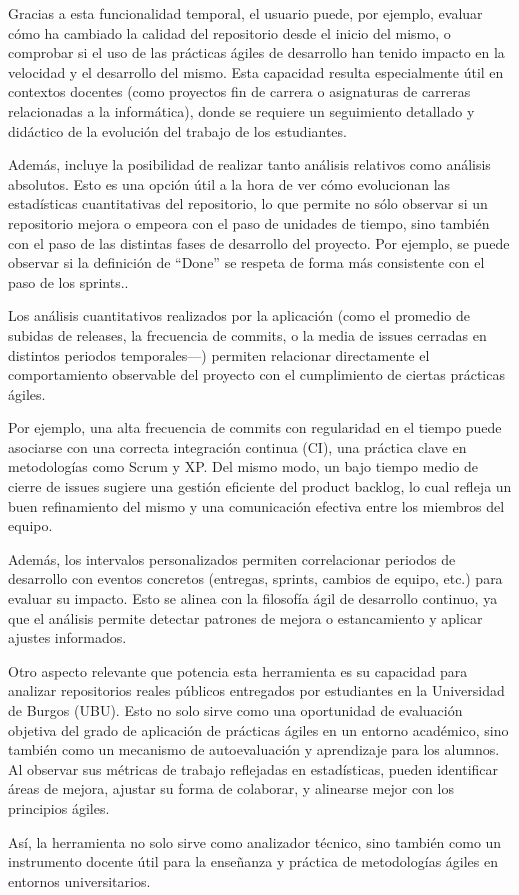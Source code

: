 Gracias a esta funcionalidad temporal, el usuario puede, por ejemplo, evaluar cómo ha cambiado la calidad del repositorio desde el inicio del mismo, o comprobar si el uso de las prácticas ágiles de desarrollo han tenido impacto en la velocidad y el desarrollo del mismo. Esta capacidad resulta especialmente útil en contextos docentes (como proyectos fin de carrera o asignaturas de carreras relacionadas a la informática), donde se requiere un seguimiento detallado y didáctico de la evolución del trabajo de los estudiantes.

Además, incluye la posibilidad de realizar tanto análisis relativos como análisis absolutos. Esto es una opción útil a la hora de ver cómo evolucionan las estadísticas cuantitativas del repositorio, lo que permite no sólo observar si un repositorio mejora o empeora con el paso de unidades de tiempo, sino también con el paso de las distintas fases de desarrollo del proyecto. Por ejemplo, se puede observar si la definición de ``Done'' se respeta de forma más consistente con el paso de los sprints.. 

Los análisis cuantitativos realizados por la aplicación (como el promedio de subidas de releases, la frecuencia de commits, o la media de issues cerradas en distintos periodos temporales—) permiten relacionar directamente el comportamiento observable del proyecto con el cumplimiento de ciertas prácticas ágiles.

Por ejemplo, una alta frecuencia de commits con regularidad en el tiempo puede asociarse con una correcta integración continua (CI), una práctica clave en metodologías como Scrum y XP. Del mismo modo, un bajo tiempo medio de cierre de issues sugiere una gestión eficiente del product backlog, lo cual refleja un buen refinamiento del mismo y una comunicación efectiva entre los miembros del equipo.

Además, los intervalos personalizados permiten correlacionar periodos de desarrollo con eventos concretos (entregas, sprints, cambios de equipo, etc.) para evaluar su impacto. Esto se alinea con la filosofía ágil de desarrollo continuo, ya que el análisis permite detectar patrones de mejora o estancamiento y aplicar ajustes informados.

Otro aspecto relevante que potencia esta herramienta es su capacidad para analizar repositorios reales públicos entregados por estudiantes en la Universidad de Burgos (UBU). Esto no solo sirve como una oportunidad de evaluación objetiva del grado de aplicación de prácticas ágiles en un entorno académico, sino también como un mecanismo de autoevaluación y aprendizaje para los alumnos. Al observar sus métricas de trabajo reflejadas en estadísticas, pueden identificar áreas de mejora, ajustar su forma de colaborar, y alinearse mejor con los principios ágiles.

Así, la herramienta no solo sirve como analizador técnico, sino también como un instrumento docente útil para la enseñanza y práctica de metodologías ágiles en entornos universitarios.